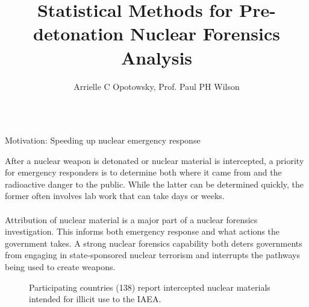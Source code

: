 \documentclass{beamer}
\title[small title]{\texorpdfstring{Statistical Methods for Pre-detonation Nuclear Forensics Analysis}
{Statistical Methods for Pre-detonation Nuclear Forensics Analysis}}
\author{Arrielle C Opotowsky, Prof. Paul PH Wilson}
\institute{University of Wisconsin-Madison}
\begin{document}
\small

\begin{frame}[t]{}
\begin{columns}

\begin{column}[T]{0.27\textwidth}
\begin{block}{Motivation: Speeding up nuclear emergency response}

After a nuclear weapon is detonated or nuclear material is intercepted, a
priority for emergency responders is to determine both where it came from and
the radioactive danger to the public. While the latter can be determined
quickly, the former often involves lab work that can take days or weeks. \\~\\

Attribution of nuclear material is a major part of a nuclear forensics
investigation. This informs both emergency response and what actions the
government takes.  A strong nuclear forensics capability both deters
governments from engaging in state-sponsored nuclear terrorism and interrupts
the pathways being used to create weapons.

\begin{figure}
  \fboxsep=1mm
  \fboxrule=3pt
  \caption{Participating countries (138) report intercepted nuclear materials
           intended for illicit use to the IAEA.\cite{trafficking}}
\end{figure}


\end{block}
\end{column}
\end{columns}
\end{frame}
\end{document}
